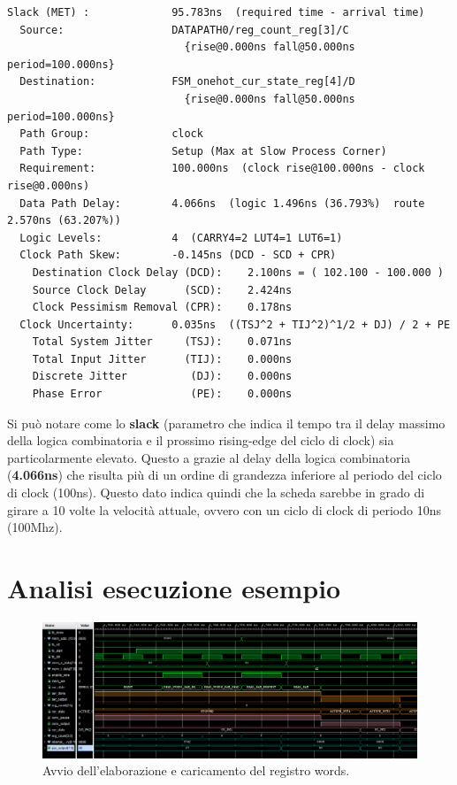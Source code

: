 \documentclass[a4paper]{report}
\begin{document}
\begin{verbatim}
Slack (MET) :             95.783ns  (required time - arrival time)
  Source:                 DATAPATH0/reg_count_reg[3]/C
                            {rise@0.000ns fall@50.000ns period=100.000ns}
  Destination:            FSM_onehot_cur_state_reg[4]/D
                            {rise@0.000ns fall@50.000ns period=100.000ns}
  Path Group:             clock
  Path Type:              Setup (Max at Slow Process Corner)
  Requirement:            100.000ns  (clock rise@100.000ns - clock rise@0.000ns)
  Data Path Delay:        4.066ns  (logic 1.496ns (36.793%)  route 2.570ns (63.207%))
  Logic Levels:           4  (CARRY4=2 LUT4=1 LUT6=1)
  Clock Path Skew:        -0.145ns (DCD - SCD + CPR)
    Destination Clock Delay (DCD):    2.100ns = ( 102.100 - 100.000 ) 
    Source Clock Delay      (SCD):    2.424ns
    Clock Pessimism Removal (CPR):    0.178ns
  Clock Uncertainty:      0.035ns  ((TSJ^2 + TIJ^2)^1/2 + DJ) / 2 + PE
    Total System Jitter     (TSJ):    0.071ns
    Total Input Jitter      (TIJ):    0.000ns
    Discrete Jitter          (DJ):    0.000ns
    Phase Error              (PE):    0.000ns
\end{verbatim}

Si può notare come lo \textbf{slack} (parametro che indica il tempo tra il delay massimo della logica combinatoria e il prossimo rising-edge del ciclo di clock) sia particolarmente elevato. Questo a grazie al delay della logica combinatoria (\textbf{4.066ns}) che risulta più di un ordine di grandezza inferiore al periodo del ciclo di clock (100ns).
Questo dato indica quindi che la scheda sarebbe in grado di girare a 10 volte la velocità attuale, ovvero con un ciclo di clock di periodo 10ns (100Mhz).

\newpage
\section{Analisi esecuzione esempio}

\begin{figure}[H]
  \centering
  \label{fig:Caricamento words}
  \includegraphics[scale = 0.25]{schematics/Caricamento words.png}
  \caption{Avvio dell'elaborazione e caricamento del registro words.}
\end{figure}
\end{document}
